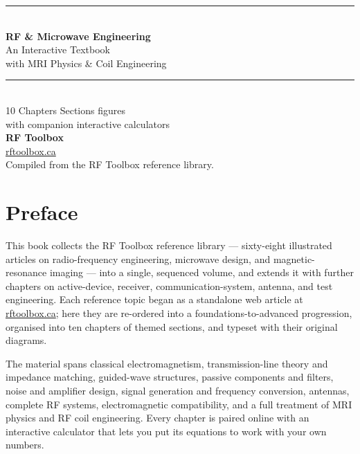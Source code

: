 \documentclass[11pt,openany]{book}
\begin{document}
\frontmatter

\begin{titlepage}
\centering
\vspace*{2.2cm}
{\color{rfpurple}\rule{\linewidth}{2pt}}\\[10pt]
{\sffamily\Huge\bfseries\color{rfpurple} RF \& Microwave Engineering}\\[10pt]
{\sffamily\LARGE An Interactive Textbook}\\[6pt]
{\sffamily\large with MRI Physics \& Coil Engineering}\\[8pt]
{\color{rfpurple}\rule{\linewidth}{2pt}}\\[26pt]
{\sffamily\large 10 Chapters \quad\textbullet{} Sections \quad\textbullet{} figures}\\[4pt]
{\sffamily\normalsize with companion interactive calculators}\\[3cm]
{\sffamily\Large\bfseries RF Toolbox}\\[4pt]
{\sffamily\normalsize\href{https://rftoolbox.ca}{rftoolbox.ca}}\\[1.2cm]
{\sffamily\small Compiled from the RF Toolbox reference library.}
\vfill
\end{titlepage}

\chapter*{Preface}
This book collects the RF Toolbox reference library — sixty-eight illustrated
articles on radio-frequency engineering, microwave design, and magnetic-resonance
imaging — into a single, sequenced volume, and extends it with further chapters on
active-device, receiver, communication-system, antenna, and test engineering. Each
reference topic began as a standalone web article at
\href{https://rftoolbox.ca}{rftoolbox.ca}; here they are re-ordered into a
foundations-to-advanced progression, organised into ten chapters of themed
sections, and typeset with their original diagrams.

The material spans classical electromagnetism, transmission-line theory and
impedance matching, guided-wave structures, passive components and filters, noise
and amplifier design, signal generation and frequency conversion, antennas,
complete RF systems, electromagnetic compatibility, and a full treatment of MRI
physics and RF coil engineering. Every chapter is paired online with an
interactive calculator that lets you put its equations to work with your own
numbers.
\end{document}
